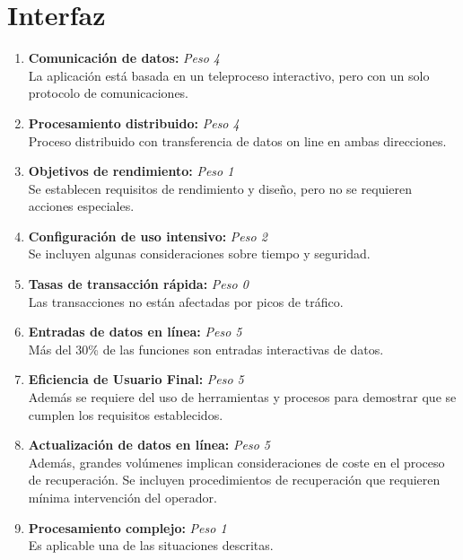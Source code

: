 \documentclass[11pt,a4paper,spanish,twoside]{book}
\begin{document}
\section{Interfaz}
\begin{enumerate}[{\bf 1.}]

\item {\bf Comunicación de datos:} \emph{Peso 4} \\ La aplicación está basada en
  un teleproceso interactivo, pero con un solo protocolo de comunicaciones.

\item {\bf Procesamiento distribuido:} \emph{Peso 4} \\ Proceso distribuido
  con transferencia de datos on line en ambas direcciones. 

\item {\bf Objetivos de rendimiento:} \emph{Peso 1} \\ Se establecen requisitos
  de rendimiento y diseño, pero no se requieren acciones especiales.

\item {\bf Configuración de uso intensivo:} \emph{Peso 2} \\ Se incluyen algunas
  consideraciones sobre tiempo y seguridad. 

\item {\bf Tasas de transacción rápida:} \emph{Peso 0} \\ Las transacciones no
  están afectadas por picos de tráfico. 

\item {\bf Entradas de datos en línea:} \emph{Peso 5} \\ Más del 30\% de las
  funciones son entradas interactivas de datos. 

\item {\bf Eficiencia de Usuario Final:} \emph{Peso 5} \\ Además se requiere del
  uso de herramientas y procesos para demostrar que se cumplen los requisitos
  establecidos.

\item {\bf Actualización de datos en línea:} \emph{Peso 5} \\ Además, grandes
  volúmenes implican consideraciones de coste en el proceso de
  recuperación. Se incluyen procedimientos de recuperación que requieren
  mínima intervención del operador. 

\item {\bf Procesamiento complejo:} \emph{Peso 1} \\ Es aplicable una de las
  situaciones descritas. 


\end{enumerate}
\end{document}
